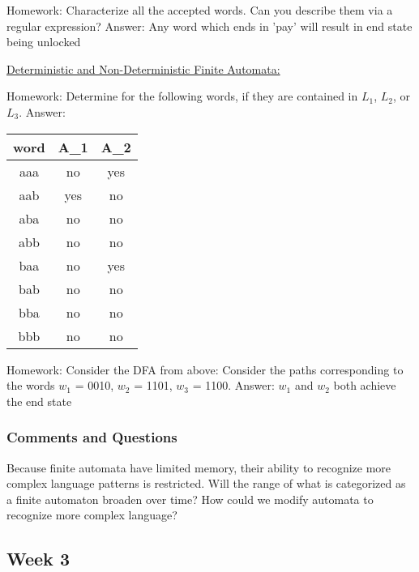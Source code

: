 \documentclass{article}
\theoremstyle{theorem}
\theoremstyle{definition}
\theoremstyle{remark}
\begin{document}
Homework: Characterize all the accepted words. Can you describe them via a regular expression?\newline
Answer: Any word which ends in 'pay' will result in end state being unlocked

\underline{Deterministic and Non-Deterministic Finite Automata:}

Homework: Determine for the following words, if they are contained in $L_{1}$, $L_{2}$, or $L_{3}$.\newline
Answer:
\begin{table}[!ht]
  \centering
  \begin{tabular}{||c c c||} 
   \hline
   word & A\_1 & A\_2 \\ [0.5ex] 
   \hline\hline
   aaa & no  & yes  \\ 
   aab & yes  & no  \\
   aba & no  & no  \\
   abb & no  & no  \\
   baa & no  & yes \\ 
   bab & no & no \\
   bba & no & no \\
   bbb & no & no \\ [1ex] 
   \hline
  \end{tabular}
  \end{table}

Homework: Consider the DFA from above: Consider the paths corresponding to the words $w_{1}$ = 0010, $w_{2}$ = 1101, $w_{3}$ = 1100.\newline
Answer: $w_{1}$ and $w_{2}$ both achieve the end state

\subsubsection*{Comments and Questions}
Because finite automata have limited memory, their ability to recognize more complex language patterns is restricted. Will the range of what is categorized as a finite automaton broaden over time? How could we modify automata to recognize more complex language?

\subsection{Week 3}

\end{document}
